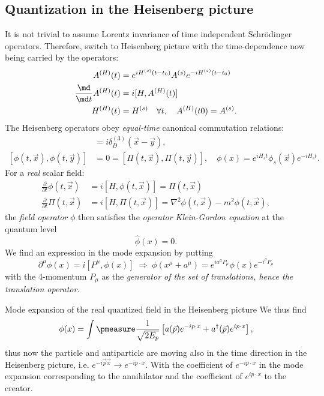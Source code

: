 \subsection{Quantization in the Heisenberg picture}
It is not trivial to assume Lorentz invariance of time independent Schrödinger operators. Therefore, switch to Heisenberg picture with the time-dependence now being carried by the operators:
\begin{align}
	A^{(H)} (t) &= e^{i H^{(s)} (t-t_0)} A^{(s)} e^{-i H^{(s)} (t-t_0)}\\
	\frac{\md}{\md t} A^{(H)} (t) &= i [H,A^{(H)}(t)] \\
	H^{(H)} (t) &= H^{(s)} \quad \forall t, \quad A^{(H)}(t0)=A^{(s)}.
\end{align}
The Heisenberg operators obey \emph{equal-time} canonical commutation relations:
\begin{align}
	[\phi(t,\vec{x}),\Pi(t,\vec{y})]&= i \delta^{(3)}_D (\vec{x}-\vec{y}),\\
	[\phi(t,\vec{x}), \phi(t,\vec{y})] &= 0 = [\Pi(t,\vec{x}) ,\Pi(t,\vec{y})], \quad \phi(x)=e^{i H_s t} \phi_s(\vec{x}) e^{- iH_s t}.
\end{align}
For a \emph{real} scalar field:
\begin{align}
	\frac{\partial}{\partial t} \phi(t,\vec{x}) &= i[H,\phi(t,\vec{x})] = \Pi(t,\vec{x})\\
	\frac{\partial}{\partial t} \Pi(t,\vec{x}) &= i [H,\Pi(t,\vec{x})] = \nabla^2 \phi(t,\vec{x}) - m^2 \phi(t,\vec{x}),
\end{align}
the \emph{field operator} $ \phi$ then satisfies the \emph{operator Klein-Gordon equation} at the quantum level 
\begin{equation}
	[\partial_{\mu} \partial^{\mu}+m^2] \hat{\phi}(x) =0.
\end{equation}
We find an expression in the mode expansion by putting
\begin{equation}
	\partial^{\mu} \phi (x) = i[P^{\mu},\phi(x)] \; \Rightarrow \; \phi(x^{\mu} +a^{\mu}) = e^{i a^{\mu} P_{\mu}} \phi(x) e^{- i^{\rho}P_{\rho}}
\end{equation}
with the 4-momentum $P_{\mu}$ as the \emph{generator of the set of translations, hence the translation operator}.\\
\begin{mybox}{Mode expansion of the real quantized field in the Heisenberg picture}
	We thus find \begin{equation}
		\phi(x) = \int \pmeasure \frac{1}{\sqrt{2E_p}} \left[a(\vec{p}) e^{- i p\cdot x} +a^{\dagger} (\vec{p}) e^{i p \cdot x} \right],
	\end{equation}
	thus now the particle and antiparticle are moving also in the time direction in the Heisenberg picture, i.e. $e^{- i \vec{p}\vec{x}} \rightarrow e^{-i p\cdot x}$. With the coefficient of $e^{- i p\cdot x }$ in the mode expansion corresponding to the annihilator and the coefficient of $e^{i p\cdot x}$ to the creator.
\end{mybox}
